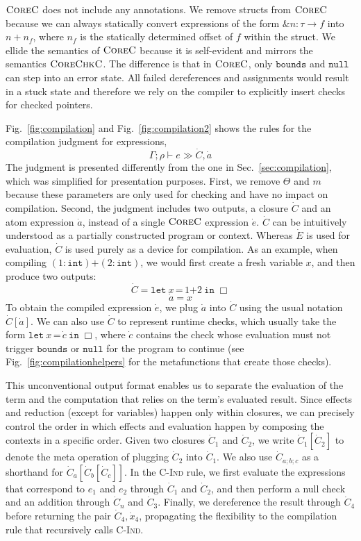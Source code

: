 \documentclass[conference]{IEEEtran}
\newcommand{\lang}{\textsc{CoreChkC}\xspace}
\newcommand{\elang}{\textsc{CoreC}\xspace}
\newcommand{\kw}[1]{\ensuremath{\mathtt{#1}}}
\newcommand{\elet}[3]{\ensuremath{\kw{let}~#1\, \texttt{=}\, #2~\kw{in}\;{#3}}}
\newcommand{\eamper}[2]{\ensuremath{\kw{\&}{#1}\kw{\rightarrow}{#2}}}
\newcommand{\ebounds}{\ensuremath{\kw{bounds}}}
\newcommand{\enull}{\ensuremath{\kw{null}}}
\newcommand{\hole}{\ensuremath{\Box}}
\newcommand{\tint}{\ensuremath{\mathtt{int}}}
\newcommand{\plus}{\mathbin{\texttt{+}}}
\begin{document}
$\elang$ does not include any annotations. We remove structs from
$\elang$ because we can always statically convert expressions of the form
$\eamper{n:\tau}{f}$ into $n + n_f$, where $n_f$ is the statically
determined offset of $f$ within the struct. We ellide the semantics of
$\elang$ because it is self-evident and mirrors the semantics
$\lang$. The difference is that in $\elang$, only $\ebounds$ and
$\enull$ can step into an error state. All failed dereferences and
assignments would result in a stuck state and therefore we rely on the
compiler to explicitly insert checks for checked pointers.


Fig.~\ref{fig:compilation} and Fig.~\ref{fig:compilation2}
 shows the rules for the compilation judgment for expressions,
\[\Gamma;\rho \vdash e \gg \dot C, \dot a\]
The judgment is presented differently from the one in
Sec.~\ref{sec:compilation}, which was simplified for presentation purposes. First,
we remove $\Theta$ and $m$ because these
parameters are only used for checking and have no
impact on compilation. Second, the judgment includes two
outputs, a closure $\dot C$ and an atom expression $\dot a$, instead of
a single $\elang$ expression $\dot e$. $\dot C$ can be intuitively understood as a
partially constructed program or context. Whereas $\dot E$ is used for
evaluation, $\dot C$
is used purely as a device for compilation. As an example,
when compiling $(1 : \tint) \plus (2 : \tint)$, 
we would first create a fresh variable $x$, and then produce two outputs:
\[    \dot C = \elet{x}{1 \plus 2}{\hole}\]
\[    \dot a = x\]
To obtain the compiled expression $\dot e$, we plug $\dot a$ into
$\dot C$ using the usual notation $\dot C[\dot a]$. We can also use $\dot C$ to represent runtime checks, which
usually take the form $\elet{x}{\dot c}{\hole}$, where $\dot c$
contains the check whose evaluation must not trigger $\ebounds$ or $\enull$ for the program to
continue (see Fig.~\ref{fig:compilationhelpers} for the metafunctions that create
those checks). 

This unconventional output format enables us to separate the
evaluation of the term and the computation that relies on the term's
evaluated result. Since effects and reduction (except for variables) happen only
within closures, we can precisely control the order in which effects
and evaluation happen by composing the contexts in a specific order.
Given two closures $\dot C_1$
and $\dot C_2$, we write $\dot C_1[\dot C_2]$ to denote the meta
operation of plugging $\dot C_2$ into $\dot C_1$. We also use
$\dot C_{a;b;c}$ as a shorthand for $\dot C_a[\dot C_b[\dot C_c]]$. In
the \textsc{C-Ind} rule,
we first evaluate the expressions that correspond to $e_1$ and $e_2$
through $\dot C_1$ and $\dot C_2$, and then perform a null check and
an addition through $\dot C_n$ and $\dot C_3$. Finally, we dereference
the result through $\dot C_4$ before returning the pair $\dot C_4,\dot
x_4$, propagating the flexibility to the compilation rule that recursively
calls \textsc{C-Ind}.
\end{document}
